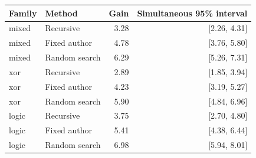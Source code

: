 \begin{tabular}{llrr}
\toprule
Family & Method & Gain & Simultaneous 95\% interval \\
\midrule
mixed & Recursive & 3.28 & [2.26, 4.31] \\
mixed & Fixed author & 4.78 & [3.76, 5.80] \\
mixed & Random search & 6.29 & [5.26, 7.31] \\
xor & Recursive & 2.89 & [1.85, 3.94] \\
xor & Fixed author & 4.23 & [3.19, 5.27] \\
xor & Random search & 5.90 & [4.84, 6.96] \\
logic & Recursive & 3.75 & [2.70, 4.80] \\
logic & Fixed author & 5.41 & [4.38, 6.44] \\
logic & Random search & 6.98 & [5.94, 8.01] \\
\bottomrule
\end{tabular}
